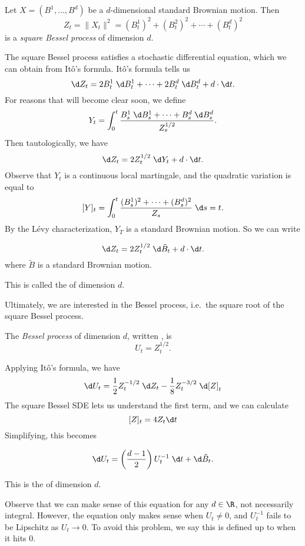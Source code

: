 \documentclass[a4paper]{article}
\begin{document}
\begin{defi}
  Let $X = (B^1, \ldots, B^d)$ be a $d$-dimensional standard Brownian motion. Then
  \[
    Z_t = \|X_t\|^2 = (B^1_t)^2 + (B_t^2)^2 + \cdots + (B_t^d)^2
  \]
  is a \emph{square Bessel process} of dimension $d$.
\end{defi}
The square Bessel process satisfies a stochastic differential equation, which we can obtain from It\^o's formula. It\^o's formula tells us
\[
  \d Z_t =  2B_t^1 \;\d B_t^1 + \cdots + 2 B_t^d\;\d B_t^d + d\cdot \d t.
\]
For reasons that will become clear soon, we define
\[
  Y_t = \int_0^t \frac{B_s^1 \;\d B_s^1 + \cdots + B_s^d \;\d B_s^d}{Z_s^{1/2}}.
\]
Then tautologically, we have
\[
  \d Z_t = 2 Z_t^{1/2} \;\d Y_t + d\cdot \d t.
\]
Observe that $Y_t$ is a continuous local martingale, and the quadratic variation is equal to
\[
  [Y]_t = \int_0^t \frac{(B_s^1)^2 + \cdots + (B_s^d)^2}{Z_s}\;\d s = t.
\]
By the L\'evy characterization, $Y_T$ is a standard Brownian motion. So we can write
\begin{lemma}
  \[
    \d Z_t = 2 Z_t^{1/2} \;\d \tilde{B}_t + d \cdot \d t.
  \]
  where $\tilde{B}$ is a standard Brownian motion.
\end{lemma}
This is called the  of dimension $d$.

Ultimately, we are interested in the Bessel process, i.e.\ the square root of the square Bessel process.
\begin{defi}
  The \emph{Bessel process} of dimension $d$, written , is
  \[
    U_t = Z_t^{1/2}.
  \]
\end{defi}
Applying It\^o's formula, we have
\[
  \d U_t = \frac{1}{2} Z_t^{-1/2} \;\d Z_t - \frac{1}{8} Z_t^{-3/2}\;\d [Z]_t
\]
The square Bessel SDE lets us understand the first term, and we can calculate
\[
  [Z]_t = 4 Z_t \d t
\]
Simplifying, this becomes
\begin{lemma}
  \[
    \d U_t = \left(\frac{d - 1}{2}\right) U_t^{-1}\;\d t + \d \tilde{B}_t.
  \]
\end{lemma}
This is the  of dimension $d$.

Observe that we can make sense of this equation for any $d \in \R$, not necessarily integral. However, the equation only makes sense when $U_t \not= 0$, and $U_t^{-1}$ fails to be Lipschitz as $U_t \to 0$. To avoid this problem, we say this is defined up to when it hits $0$.
\end{document}
